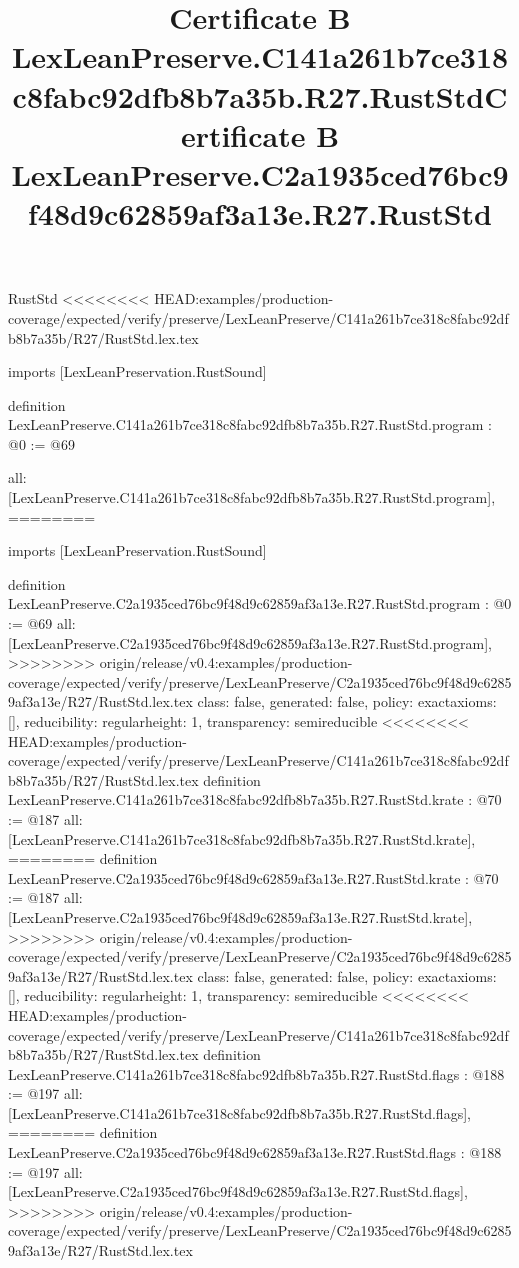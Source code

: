 \begin{lexlean}{RustStd}
<<<<<<<< HEAD:examples/production-coverage/expected/verify/preserve/LexLeanPreserve/C141a261b7ce318c8fabc92dfb8b7a35b/R27/RustStd.lex.tex
\title{Certificate B LexLeanPreserve.C141a261b7ce318c8fabc92dfb8b7a35b.R27.RustStd}
\begin{coremodule}
imports [LexLeanPreservation.RustSound]

definition LexLeanPreserve.C141a261b7ce318c8fabc92dfb8b7a35b.R27.RustStd.program : @0 := @69 {
  all: [LexLeanPreserve.C141a261b7ce318c8fabc92dfb8b7a35b.R27.RustStd.program],
========
\title{Certificate B LexLeanPreserve.C2a1935ced76bc9f48d9c62859af3a13e.R27.RustStd}
\begin{coremodule}
imports [LexLeanPreservation.RustSound]

definition LexLeanPreserve.C2a1935ced76bc9f48d9c62859af3a13e.R27.RustStd.program : @0 := @69 {
  all: [LexLeanPreserve.C2a1935ced76bc9f48d9c62859af3a13e.R27.RustStd.program],
>>>>>>>> origin/release/v0.4:examples/production-coverage/expected/verify/preserve/LexLeanPreserve/C2a1935ced76bc9f48d9c62859af3a13e/R27/RustStd.lex.tex
  class: false,
  generated: false,
  policy: exact{axioms: []},
  reducibility: regular{height: 1},
  transparency: semireducible
}
<<<<<<<< HEAD:examples/production-coverage/expected/verify/preserve/LexLeanPreserve/C141a261b7ce318c8fabc92dfb8b7a35b/R27/RustStd.lex.tex
definition LexLeanPreserve.C141a261b7ce318c8fabc92dfb8b7a35b.R27.RustStd.krate : @70 := @187 {
  all: [LexLeanPreserve.C141a261b7ce318c8fabc92dfb8b7a35b.R27.RustStd.krate],
========
definition LexLeanPreserve.C2a1935ced76bc9f48d9c62859af3a13e.R27.RustStd.krate : @70 := @187 {
  all: [LexLeanPreserve.C2a1935ced76bc9f48d9c62859af3a13e.R27.RustStd.krate],
>>>>>>>> origin/release/v0.4:examples/production-coverage/expected/verify/preserve/LexLeanPreserve/C2a1935ced76bc9f48d9c62859af3a13e/R27/RustStd.lex.tex
  class: false,
  generated: false,
  policy: exact{axioms: []},
  reducibility: regular{height: 1},
  transparency: semireducible
}
<<<<<<<< HEAD:examples/production-coverage/expected/verify/preserve/LexLeanPreserve/C141a261b7ce318c8fabc92dfb8b7a35b/R27/RustStd.lex.tex
definition LexLeanPreserve.C141a261b7ce318c8fabc92dfb8b7a35b.R27.RustStd.flags : @188 := @197 {
  all: [LexLeanPreserve.C141a261b7ce318c8fabc92dfb8b7a35b.R27.RustStd.flags],
========
definition LexLeanPreserve.C2a1935ced76bc9f48d9c62859af3a13e.R27.RustStd.flags : @188 := @197 {
  all: [LexLeanPreserve.C2a1935ced76bc9f48d9c62859af3a13e.R27.RustStd.flags],
>>>>>>>> origin/release/v0.4:examples/production-coverage/expected/verify/preserve/LexLeanPreserve/C2a1935ced76bc9f48d9c62859af3a13e/R27/RustStd.lex.tex
}}}
\end{coremodule}}
\end{coremodule}
\end{lexlean}
